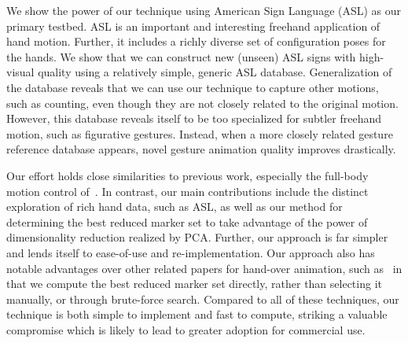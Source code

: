 We show the power of our technique using American Sign Language (ASL) as our primary testbed. ASL
is an important and interesting freehand application of hand motion.  Further, it includes a richly diverse
set of configuration poses for the hands.   We show that we can construct new (unseen) ASL signs with 
high-visual quality using a relatively simple, generic ASL database.  Generalization of the database
reveals that we can use our technique to capture other motions, such as counting, even though they
are not closely related to the original motion.  However, this database reveals itself to be too specialized
for subtler freehand motion, such as figurative gestures.  Instead, when a more closely related gesture reference database appears, novel gesture animation quality improves drastically.   

Our effort holds close 
similarities to previous work, especially the full-body motion control of~\cite{Chai05}.  In contrast, our main contributions include the distinct exploration of rich hand data, such as ASL, as well as our method for determining the best reduced marker set to take advantage of the power of dimensionality
reduction realized by PCA.  Further, our approach is far simpler and lends itself to ease-of-use and
re-implementation.
Our approach also has notable advantages over other related papers for hand-over animation,
such as~\cite{Hoyet,KanWheZor12} in that we compute the best reduced marker set directly, rather than selecting it manually, or through brute-force search.
Compared to all of these techniques, our technique is both simple to implement and fast to compute,
striking a valuable compromise which is likely to lead to greater adoption for commercial use.

